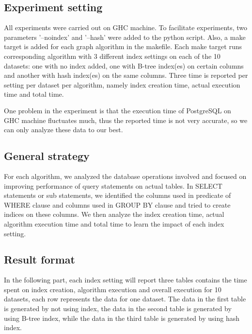 \subsection{Experiment setting}
\par All experiments were carried out on GHC machine. To facilitate experiments, two parameters '--noindex' and '--hash' were added to the python script. Also, a make target is added for each graph algorithm in the makefile. Each make target runs corresponding algorithm with 3 different index settings on each of the 10 datasets: one with no index added, one with B-tree index(es) on certain columns and another with hash index(es) on the same columns. Three time is reported per setting per dataset per algorithm, namely index creation time, actual execution time and total time.
\par One problem in the experiment is that the execution time of PostgreSQL on GHC machine fluctuates much, thus the reported time is not very accurate, so we can only analyze these data to our best.

\subsection{General strategy}
\par For each algorithm, we analyzed the database operations involved and focused on improving performance of query statements on actual tables. In SELECT statements or sub statements, we identified the columns used in predicate of WHERE clause and columns used in GROUP BY clause and 
tried to create indices on these columns. We then analyze the index creation time, actual algorithm execution time and total time to learn the impact of each index setting.

\subsection{Result format}
\par In the following part, each index setting will report three tables contains the time spent on index creation, algorithm execution and overall execution for 10 datasets, each row represents the data for one dataset. The data in the first table is generated by not using index, the data in the second table is generated by using B-tree index, while the data in the third table is generated by using hash index.

